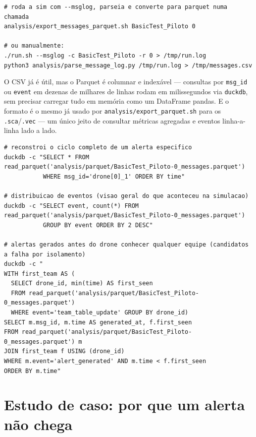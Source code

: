 \documentclass[11pt,a4paper]{article}
\begin{document}
\begin{lstlisting}[style=shellcmd]
# roda a sim com --msglog, parseia e converte para parquet numa chamada
analysis/export_messages_parquet.sh BasicTest_Piloto 0

# ou manualmente:
./run.sh --msglog -c BasicTest_Piloto -r 0 > /tmp/run.log
python3 analysis/parse_message_log.py /tmp/run.log > /tmp/messages.csv
\end{lstlisting}

\begin{explica}
O CSV já é útil, mas o Parquet é columnar e indexável --- consultas por
\texttt{msg\_id} ou \texttt{event} em dezenas de milhares de linhas rodam
em milissegundos via \texttt{duckdb}, sem precisar carregar tudo em memória
como um DataFrame pandas. E o formato é o mesmo já usado por
\texttt{analysis/export\_parquet.sh} para os \texttt{.sca}/\texttt{.vec} ---
um único jeito de consultar métricas agregadas e eventos linha-a-linha lado
a lado.
\end{explica}

\begin{lstlisting}[style=shellcmd]
# reconstroi o ciclo completo de um alerta especifico
duckdb -c "SELECT * FROM read_parquet('analysis/parquet/BasicTest_Piloto-0_messages.parquet')
           WHERE msg_id='drone[0]_1' ORDER BY time"

# distribuicao de eventos (visao geral do que aconteceu na simulacao)
duckdb -c "SELECT event, count(*) FROM read_parquet('analysis/parquet/BasicTest_Piloto-0_messages.parquet')
           GROUP BY event ORDER BY 2 DESC"

# alertas gerados antes do drone conhecer qualquer equipe (candidatos a falha por isolamento)
duckdb -c "
WITH first_team AS (
  SELECT drone_id, min(time) AS first_seen
  FROM read_parquet('analysis/parquet/BasicTest_Piloto-0_messages.parquet')
  WHERE event='team_table_update' GROUP BY drone_id)
SELECT m.msg_id, m.time AS generated_at, f.first_seen
FROM read_parquet('analysis/parquet/BasicTest_Piloto-0_messages.parquet') m
JOIN first_team f USING (drone_id)
WHERE m.event='alert_generated' AND m.time < f.first_seen
ORDER BY m.time"
\end{lstlisting}

\newpage
\section{Estudo de caso: por que um alerta não chega}
\label{sec:estudo-caso}
\end{document}
